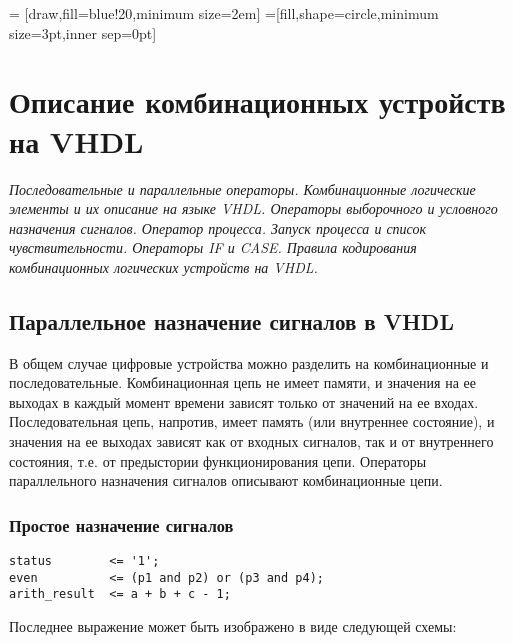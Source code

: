  = [draw,fill=blue!20,minimum size=2em]
=[fill,shape=circle,minimum size=3pt,inner sep=0pt]

\chapter{Описание комбинационных устройств на VHDL}

\emph{Последовательные и параллельные операторы. Комбинационные логические элементы и их описание на языке VHDL. Операторы выборочного и условного назначения сигналов. Оператор процесса. Запуск процесса и список чувствительности. Операторы IF и CASE. Правила кодирования комбинационных логических устройств на VHDL.}

\section{Параллельное назначение сигналов в VHDL}

В общем случае цифровые устройства можно разделить на комбинационные и последовательные. Комбинационная цепь не имеет памяти, и значения на ее выходах в каждый момент времени зависят только от значений на ее входах.  Последовательная цепь, напротив, имеет память (или внутреннее состояние), и значения на ее выходах зависят как от входных сигналов, так и от внутреннего состояния, т.е. от предыстории функционирования цепи. Операторы параллельного назначения сигналов описывают комбинационные цепи.

\subsection{Простое назначение сигналов}
\begin{Code}
\begin{lstlisting}
status        <= '1';
even          <= (p1 and p2) or (p3 and p4);
arith_result  <= a + b + c - 1;
\end{lstlisting}
\end{Code}
Последнее выражение может быть изображено в виде следующей схемы:

